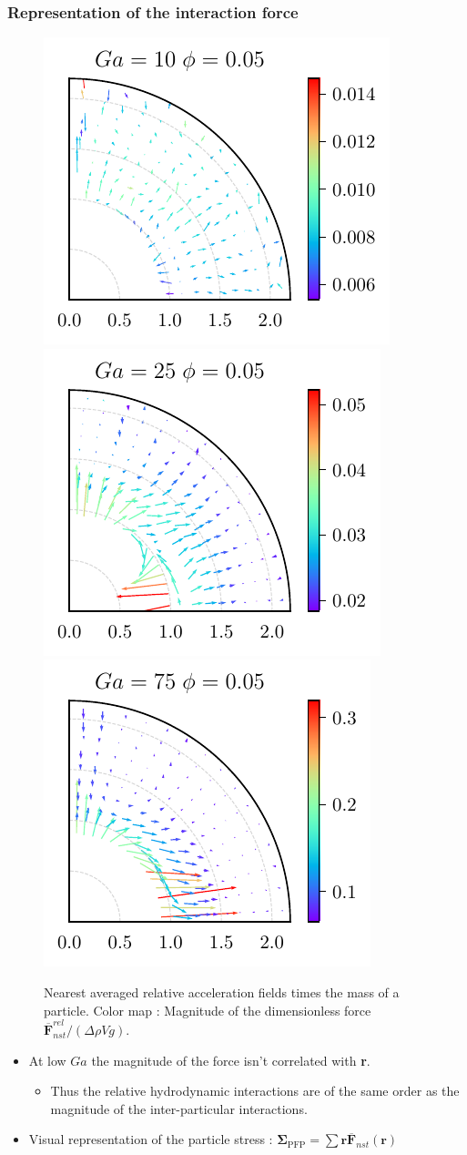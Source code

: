 \documentclass{sintefbeamer}
\newcommand{\nstavg}[1]{\overline{#1}_{nst}}
\newcommand{\nstrelavg}[1]{\overline{#1}_{nst}^{rel}}
\begin{document}
\begin{frame}
  \frametitle{Representation of the interaction force}

  \begin{figure}
    
    \includegraphics[height=0.25\textwidth]{image/HOMOGENEOUS/fDrop/F_mu_r_0_1_Ga_10_PHI_0_05.pdf}
    \includegraphics[height=0.25\textwidth]{image/HOMOGENEOUS/fDrop/F_mu_r_0_1_Ga_25_PHI_0_05.pdf}
    \includegraphics[height=0.25\textwidth]{image/HOMOGENEOUS/fDrop/F_mu_r_0_1_Ga_75_PHI_0_05.pdf}
    
    \caption{Nearest averaged relative acceleration fields times the mass of a particle. 
    Color map : Magnitude of the dimensionless force  $\nstrelavg{\textbf{F}} / (\Delta \rho V g)$.}
  \end{figure}

  
\begin{itemize}
  \item At low $Ga$ the magnitude of the force isn't correlated with \textbf{r}.
  \begin{itemize}
    \item Thus the relative hydrodynamic interactions are of the same order as the magnitude of the inter-particular interactions. 
  \end{itemize}
  \item  Visual representation of the particle stress : 
    $\bm{\Sigma}_{\text{PFP}} = \sum \textbf{r} 
    \nstavg{\textbf{F}}(\textbf{r}) 
    $
\end{itemize}
\end{frame}
\end{document}
